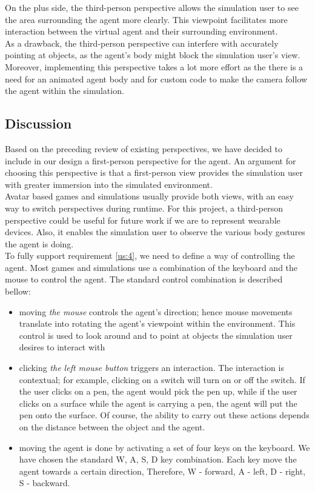 On the plus side, the third-person perspective allows the simulation user to see the area surrounding the agent more clearly. This viewpoint facilitates more interaction between the virtual agent and their surrounding environment.\\

As a drawback, the third-person perspective can interfere with accurately pointing at objects, as the agent's body might block the simulation user's view. Moreover, implementing this perspective takes a lot more effort as the there is a need for an animated agent body and for custom code to make the camera follow the agent within the simulation.\\

\subsection{Discussion}\label{subsec:agent_discussion}
Based on the preceding review of existing perspectives, we have decided to include in our design a first-person perspective for the agent. An argument for choosing this perspective is that a first-person view provides the simulation user with greater immersion into the simulated environment.\\

Avatar based games and simulations usually provide both views, with an easy way to switch perspectives during runtime. For this project, a third-person perspective could be useful for future work if we are to represent wearable devices. Also, it enables the simulation user to observe the various body gestures the agent is doing.\\

To fully support requirement \ref{us:4}, we need to define a way of controlling the agent. Most games and simulations use a combination of the keyboard and the mouse to control the agent. The standard control combination is described bellow:
\begin{itemize}
	\item moving \emph{the mouse} controls the agent's direction; hence mouse movements translate into rotating the agent's viewpoint within the environment. This control is used to look around and to point at objects the simulation user desires to interact with
	\item clicking \emph{the left mouse button} triggers an interaction. The interaction is contextual; for example, clicking on a switch will turn on or off the switch. If the user clicks on a pen, the agent would pick the pen up, while if the user clicks on a surface while the agent is carrying a pen, the agent will put the pen onto the surface. Of course, the ability to carry out these actions depends on the distance between the object and the agent.
	\item moving the agent is done by activating a set of four keys on the keyboard. We have chosen the standard W, A, S, D key combination. Each key move the agent towards a certain direction, Therefore, W - forward, A - left, D - right, S - backward.
\end{itemize}


